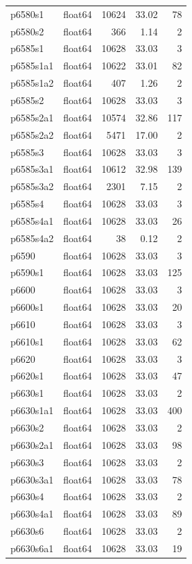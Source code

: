 \begin{longtable}{llrrr}
p6580s1 & float64 & 10624 & 33.02 & 78 \\
p6580s2 & float64 & 366 & 1.14 & 2 \\
p6585s1 & float64 & 10628 & 33.03 & 3 \\
p6585s1a1 & float64 & 10622 & 33.01 & 82 \\
p6585s1a2 & float64 & 407 & 1.26 & 2 \\
p6585s2 & float64 & 10628 & 33.03 & 3 \\
p6585s2a1 & float64 & 10574 & 32.86 & 117 \\
p6585s2a2 & float64 & 5471 & 17.00 & 2 \\
p6585s3 & float64 & 10628 & 33.03 & 3 \\
p6585s3a1 & float64 & 10612 & 32.98 & 139 \\
p6585s3a2 & float64 & 2301 & 7.15 & 2 \\
p6585s4 & float64 & 10628 & 33.03 & 3 \\
p6585s4a1 & float64 & 10628 & 33.03 & 26 \\
p6585s4a2 & float64 & 38 & 0.12 & 2 \\
p6590 & float64 & 10628 & 33.03 & 3 \\
p6590s1 & float64 & 10628 & 33.03 & 125 \\
p6600 & float64 & 10628 & 33.03 & 3 \\
p6600s1 & float64 & 10628 & 33.03 & 20 \\
p6610 & float64 & 10628 & 33.03 & 3 \\
p6610s1 & float64 & 10628 & 33.03 & 62 \\
p6620 & float64 & 10628 & 33.03 & 3 \\
p6620s1 & float64 & 10628 & 33.03 & 47 \\
p6630s1 & float64 & 10628 & 33.03 & 2 \\
p6630s1a1 & float64 & 10628 & 33.03 & 400 \\
p6630s2 & float64 & 10628 & 33.03 & 2 \\
p6630s2a1 & float64 & 10628 & 33.03 & 98 \\
p6630s3 & float64 & 10628 & 33.03 & 2 \\
p6630s3a1 & float64 & 10628 & 33.03 & 78 \\
p6630s4 & float64 & 10628 & 33.03 & 2 \\
p6630s4a1 & float64 & 10628 & 33.03 & 89 \\
p6630s6 & float64 & 10628 & 33.03 & 2 \\
p6630s6a1 & float64 & 10628 & 33.03 & 19 \\

\end{longtable}

